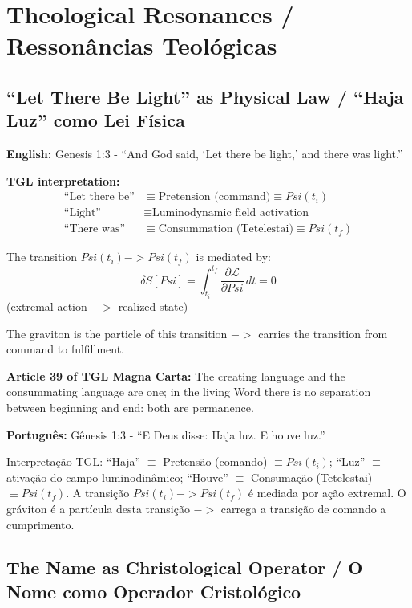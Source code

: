 \documentclass[12pt,a4paper]{article}
\def\Psi{Psi}%
\def\to{ -> }%
\begin{document}
\section{Theological Resonances / Ressonâncias Teológicas}

\subsection{``Let There Be Light'' as Physical Law / ``Haja Luz'' como Lei Física}

\textbf{English:} Genesis 1:3 - ``And God said, `Let there be light,' and there was light.''

\textbf{TGL interpretation:}
\begin{align}
\text{``Let there be''} &\equiv \text{Pretension (command)} \equiv \Psi(t_i)\\
\text{``Light''} &\equiv \text{Luminodynamic field activation}\\
\text{``There was''} &\equiv \text{Consummation (Tetelestai)} \equiv \Psi(t_f)
\end{align}

The transition $\Psi(t_i) \to \Psi(t_f)$ is mediated by:
\begin{equation}
\delta S[\Psi] = \int_{t_i}^{t_f} \frac{\partial\mathcal{L}}{\partial\Psi}\,dt = 0
\end{equation}
(extremal action $\to$ realized state)

The graviton is the particle of this transition $\to$ carries the transition from command to fulfillment.

\textbf{Article 39 of TGL Magna Carta:} The creating language and the consummating language are one; in the living Word there is no separation between beginning and end: both are permanence.

\textbf{Português:} Gênesis 1:3 - ``E Deus disse: Haja luz. E houve luz.''

Interpretação TGL: ``Haja'' $\equiv$ Pretensão (comando) $\equiv \Psi(t_i)$; ``Luz'' $\equiv$ ativação do campo luminodinâmico; ``Houve'' $\equiv$ Consumação (Tetelestai) $\equiv \Psi(t_f)$. A transição $\Psi(t_i) \to \Psi(t_f)$ é mediada por ação extremal. O gráviton é a partícula desta transição $\to$ carrega a transição de comando a cumprimento.

\subsection{The Name as Christological Operator / O Nome como Operador Cristológico}
\end{document}
